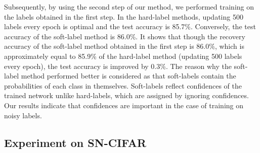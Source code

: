 \documentclass[10pt,twocolumn,letterpaper]{article}
\begin{document}
Subsequently, by using the second step of our method, we performed training on the labels obtained in the first step. In the hard-label methods, updating 500 labels every epoch is optimal and the test accuracy is 85.7\%. Conversely, the test accuracy of the soft-label method is 86.0\%. It shows that though the recovery accuracy of the soft-label method obtained in the first step is 86.0\%, which is approximately equal to 85.9\% of the hard-label method (updating 500 labels every epoch), the test accuracy is improved by 0.3\%. The reason why the soft-label method performed better is considered as that soft-labels contain the probabilities of each class in themselves.
Soft-labels reflect confidences of the trained network unlike hard-labels, which are assigned by ignoring confidences. Our results indicate that confidences are important in the case of training on noisy labels.

\subsection{Experiment on SN-CIFAR}\label{sec:uni}
\begin{table*}[t]
  \vspace{-3mm}
  \caption{Test and recovery accuracy of different baselines on the CIFAR-10 dataset with symmetric noise. We report the average score of 5 trials.}
  \vspace{-2mm}
  \begin{center}
  \end{center}
  \label{tab:uni}
  \vspace{-5mm}
\end{table*}
\end{document}
